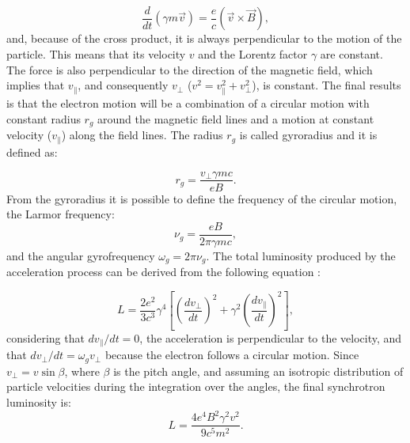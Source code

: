 \documentclass[../thesis.tex]{subfiles}
\begin{document}
\begin{equation}
    \label{eq:mag_force}
    \frac{d}{dt}(\gamma m \vec{v})=\frac{e}{c}\left(\vec{v}\times\vec{B}\right),
\end{equation}
and, because of the cross product, it is always perpendicular to the motion of the particle.
This means that its velocity $v$ and the Lorentz factor $\gamma$ are constant.
The force is also perpendicular to the direction of the magnetic field, which implies that $v_{\parallel}$, and consequently $v_{\bot}$ ($v^2 = v^2_{\parallel} + v^2_{\bot}$), is constant.
The final results is that the electron motion will be a combination of a circular motion with constant radius $r_g$ around the magnetic field lines and a motion at constant velocity ($v_{\parallel}$) along the field lines.
The radius $r_g$ is called gyroradius and it is defined as:

\begin{equation}
    \label{eq:gyroradius}
    r_g = \frac{v_{\bot}\gamma m c}{e B}.
\end{equation}
From the gyroradius it is possible to define the frequency of the circular motion, the Larmor frequency:
\begin{equation}
    \label{eq:larmor_freq}
    \nu_g = \frac{e B}{2\pi \gamma m c},
\end{equation}
and the angular gyrofrequency $\omega_g = 2\pi \nu_g$.
The total luminosity produced by the acceleration process can be derived from the following equation \citep{Rybicki86}:

\begin{equation}
    \label{eq:rybicki}
    L = \frac{2e^2}{3c^3}\gamma^4\left[\left(\frac{dv_{\bot}}{dt}\right)^2+\gamma^2\left(\frac{dv_{\parallel}}{dt}\right)^2\right],
\end{equation}
considering that $dv_{\parallel}/dt = 0$, the acceleration is perpendicular to the velocity, and that $dv_{\bot}/dt = \omega_gv_{\bot}$ because the electron follows a circular motion.
Since $v_{\bot} = v\sin\beta$, where $\beta$ is the pitch angle, and assuming an isotropic distribution of particle velocities during the integration over the angles, the final synchrotron luminosity is:
\begin{equation}
    \label{eq:sync_lum}
    L  = \frac{4e^4B^2\gamma^2v^2}{9c^5m^2}.
\end{equation}
\end{document}
